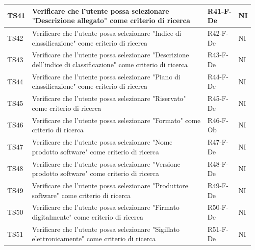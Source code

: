 \documentclass[a4paper,12pt]{article}
\begin{document}
\begin{longtable}{|M{1.2cm}|M{6.3cm}|M{2.5cm}|M{1.5cm}|}
                TS41 & Verificare che l'utente possa selezionare "Descrizione allegato" come criterio di ricerca & R41-F-De & NI \\
                \hline
                
                TS42 & Verificare che l'utente possa selezionare "Indice di classificazione" come criterio di ricerca & R42-F-De & NI \\
                \hline
                
                TS43 & Verificare che l'utente possa selezionare "Descrizione dell'indice di classificazione" come criterio di ricerca & R43-F-De & NI \\
                \hline

                TS44 & Verificare che l'utente possa selezionare "Piano di classificazione" come criterio di ricerca & R44-F-De & NI \\
                \hline
            
                TS45 & Verificare che l'utente possa selezionare "Riservato" come criterio di ricerca & R45-F-De & NI \\
                \hline
                
                TS46 & Verificare che l'utente possa selezionare "Formato" come criterio di ricerca & R46-F-Ob & NI \\
                \hline
                
                TS47 & Verificare che l'utente possa selezionare "Nome prodotto software" come criterio di ricerca & R47-F-De & NI \\
                \hline
                                
                TS48 & Verificare che l'utente possa selezionare "Versione prodotto software" come criterio di ricerca & R48-F-De & NI \\
                \hline
                                
                TS49 & Verificare che l'utente possa selezionare "Produttore software" come criterio di ricerca & R49-F-De & NI \\
                \hline
                                
                TS50 & Verificare che l'utente possa selezionare "Firmato digitalmente" come criterio di ricerca & R50-F-De & NI \\
                \hline
                                
                TS51 & Verificare che l'utente possa selezionare "Sigillato elettronicamente" come criterio di ricerca & R51-F-De & NI \\
                \hline
                                

\end{longtable}
\end{document}
